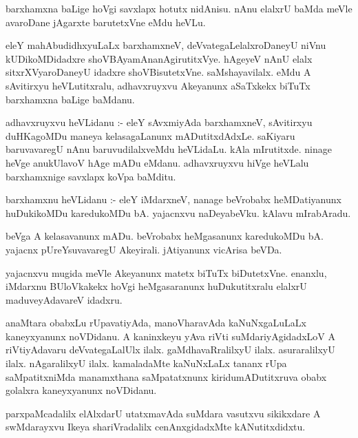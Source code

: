 \documentclass{article}
\begin{document}
\begin{mn}
barxhamxna baLige hoVgi savxlapx hotutx nidAnisu.  nAnu elalxrU baMda meVle 
avaroDane jAgarxte barutetxVne eMdu heVLu.
\end{mn}

\begin{mn}
eleY  mahAbudidhxyuLaLx  barxhamxneV,  deVvategaLelalxroDaneyU  niVnu kUDikoMDidadxre  
shoVBAyamAnanAgirutitxVye.  hAgeyeV nAnU elalx sitxrXVyaroDaneyU idadxre 
shoVBisutetxVne.  saMshayavilalx.  eMdu A sAvitirxyu  heVLutitxralu, 
adhavxruyxvu Akeyanunx aSaTxkekx biTuTx  barxhamxna baLige baMdanu.
\end{mn}

\begin{mn}
adhavxruyxvu heVLidanu :- eleY  sAvxmiyAda barxhamxneV, sAvitirxyu duHKagoMDu 
maneya kelasagaLanunx  mADutitxdAdxLe.  saKiyaru baruvavaregU nAnu 
baruvudilalxveMdu heVLidaLu.  kAla mIrutitxde.  ninage heVge anukUlavoV hAge 
mADu eMdanu.  adhavxruyxvu hiVge heVLalu barxhamxnige savxlapx koVpa baMditu.
\end{mn}

\begin{mn}
barxhamxnu  heVLidanu :- eleY  iMdarxneV,  nanage  beVrobabx  heMDatiyanunx 
huDukikoMDu karedukoMDu bA.  yajacnxvu naDeyabeVku. kAlavu mIrabAradu.
\end{mn}

\begin{mn}
beVga A kelasavanunx mADu.  beVrobabx heMgasanunx  karedukoMDu bA.  yajacnx 
pUreYsuvavaregU  Akeyirali.  jAtiyanunx  vicArisa beVDa.
\end{mn}

\begin{mn}
yajacnxvu mugida meVle Akeyanunx matetx biTuTx biDutetxVne.  enanxlu,  iMdarxnu 
BUloVkakekx hoVgi heMgasaranunx huDukutitxralu  elalxrU  maduveyAdavareV  idadxru.
\end{mn}

\begin{mn}
anaMtara obabxLu rUpavatiyAda,  manoVharavAda kaNuNxgaLuLaLx  kaneyxyanunx  
noVDidanu.  A kaninxkeyu  yAva riVti suMdariyAgidadxLoV  A riVtiyAdavaru  
deVvategaLalUlx ilalx.  gaMdhavaRralilxyU  ilalx.  asuraralilxyU ilalx.  
nAgaralilxyU ilalx.  kamaladaMte  kaNuNxLaLx tananx rUpa saMpatitxniMda  manamxthana  
saMpatatxnunx  kiridumADutitxruva  obabx  golalxra kaneyxyanunx  noVDidanu.
\end{mn}

\begin{mn}
parxpaMcadalilx elAlxdarU utatxmavAda suMdara vasutxvu sikikxdare A swMdarayxvu 
Ikeya shariVradalilx cenAnxgidadxMte kANutitxdidxtu.
\end{mn}
\end{document}
